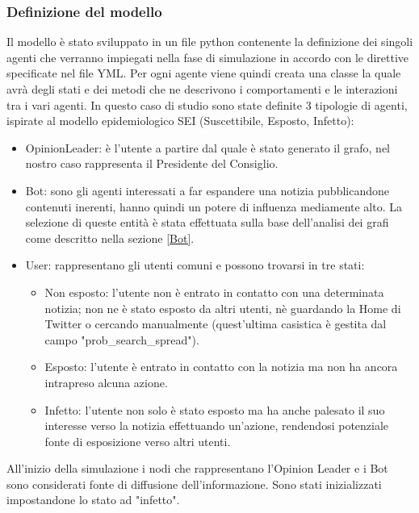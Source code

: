         \subsubsection{Definizione del modello}
        Il modello è stato sviluppato in un file python contenente la definizione dei singoli agenti che verranno impiegati nella fase di simulazione in accordo con le direttive specificate nel file YML. Per ogni agente viene quindi creata una classe la quale avrà degli stati e dei metodi che ne descrivono i comportamenti e le interazioni tra i vari agenti. In questo caso  di studio sono state definite 3 tipologie di agenti, ispirate al modello epidemiologico SEI (Suscettibile, Esposto, Infetto):
        \begin{itemize}
            \item OpinionLeader: è l’utente a partire dal quale è stato generato il grafo, nel nostro caso rappresenta il Presidente del Consiglio.
            \item Bot: sono gli agenti interessati a far espandere una notizia pubblicandone contenuti inerenti, hanno quindi un potere di influenza mediamente alto. La selezione di queste entità è stata effettuata sulla base dell'analisi dei grafi come descritto nella sezione \ref{Bot}.
            \item User: rappresentano gli utenti comuni e possono trovarsi in tre stati:
                  \begin{itemize}
                      \item Non esposto: l’utente non è entrato in contatto con una determinata notizia; non ne è  stato esposto da altri utenti, nè guardando la Home di Twitter o cercando manualmente (quest'ultima casistica è gestita dal campo "prob\_search\_spread").
                      \item Esposto: l’utente è entrato in contatto con la notizia ma non ha ancora intrapreso alcuna azione.
                      \item Infetto: l’utente non solo è stato esposto ma ha anche palesato il suo interesse verso la notizia effettuando un'azione, rendendosi potenziale fonte di esposizione verso altri utenti.
              \end{itemize}
        \end{itemize}
        
        All’inizio della simulazione i nodi che rappresentano l'Opinion Leader e i Bot sono considerati fonte di diffusione dell'informazione. Sono stati inizializzati impostandone lo stato ad "infetto". 
        
